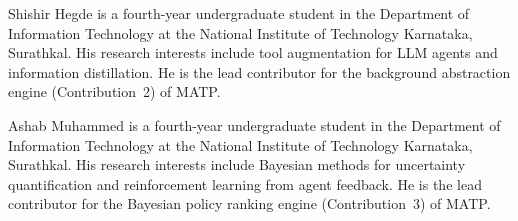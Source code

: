 \documentclass[lettersize,journal]{IEEEtran}
\begin{document}
\begin{IEEEbiographynophoto}{Shishir Hegde}
is a fourth-year undergraduate student in the Department of Information Technology at the National Institute of Technology Karnataka, Surathkal. His research interests include tool augmentation for LLM agents and information distillation. He is the lead contributor for the background abstraction engine (Contribution~2) of MATP.
\end{IEEEbiographynophoto}

\begin{IEEEbiographynophoto}{Ashab Muhammed}
is a fourth-year undergraduate student in the Department of Information Technology at the National Institute of Technology Karnataka, Surathkal. His research interests include Bayesian methods for uncertainty quantification and reinforcement learning from agent feedback. He is the lead contributor for the Bayesian policy ranking engine (Contribution~3) of MATP.
\end{IEEEbiographynophoto}

\vfill
\end{document}

